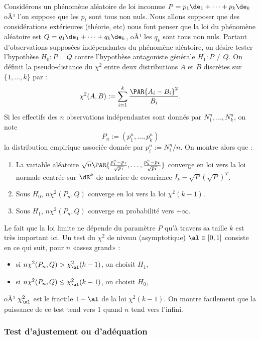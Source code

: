 Considérons un phénomène aléatoire de loi inconnue $P=p_1\de_1+\cdots+p_k\de_k$ oÃ¹
l'on suppose que les $p_i$ sont tous non nuls. Nous allons supposer que des
considérations extérieures (théorie, etc) nous font penser que la loi du
phénomène aléatoire est $Q=q_1\de_1+\cdots+q_k\de_k$, oÃ¹ les $q_k$ sont tous non
nuls. Partant d'observations supposées indépendantes du phénomène aléatoire,
on désire tester l'hypothèse $H_0 : P=Q$ contre l'hypothèse antagoniste
générale $H_1: P\neq Q$. On définit la pseudo-distance du $\chi^2$ entre deux
distributions $A$ et $B$ discrètes sur $\{1,\ldots,k\}$ par :
$$
\chi^2(A,B):=\sum_{i=1}^k \frac{\PAR{A_i-B_i}^2}{B_i}.
$$
Si les effectifs des $n$ observations indépendantes sont donnés par
$N_1^n,\ldots,N_k^n$, on note 
$$
P_n:=(p^n_1,\ldots,p^n_k)
$$ 
la distribution empirique associée donnée par $p^n_i:=N_i^n/n$. 
On montre alors que :
\begin{enumerate}
\item La variable aléatoire $\sqrt{n}
  \PAR{\frac{p_1^n-p_1}{\sqrt{p_1}},\ldots,\frac{p_k^n-p_k}{\sqrt{p_k}}}$
  converge en loi vers la loi normale centrée sur $\dR^k$ de matrice de
  covariance $I_k-\sqrt{P}(\sqrt{P})^T$.
\item Sous $H_0$, $n\chi^2(P_n,Q)$ converge en loi vers la loi $\chi^2(k-1)$.
\item Sous $H_1$, $n\chi^2(P_n,Q)$ converge en probabilité vers $+\infty$.
\end{enumerate}
Le fait que la loi limite ne dépende du paramètre $P$ qu'à travers sa taille
$k$ est très important ici.  Un test du $\chi^2$ de niveau (asymptotique)
$\al\in[0,1]$ consiste en ce qui suit, pour $n$ «assez grand» :
\begin{itemize}
\item si $n\chi^2(P_n,Q)>\chi_\al^2(k-1)$, on choisit $H_1$,
\item si $n\chi^2(P_n,Q)\leq\chi_\al^2(k-1)$, on choisit $H_0$,
\end{itemize}
oÃ¹ $\chi^2_\al$ est le fractile $1-\al$ de la loi $\chi^2(k-1)$.
On montre facilement que la puissance de ce test tend vers $1$ quand $n$ tend
vers l'infini.

\subsubsection{Test d'ajustement ou d'adéquation}

